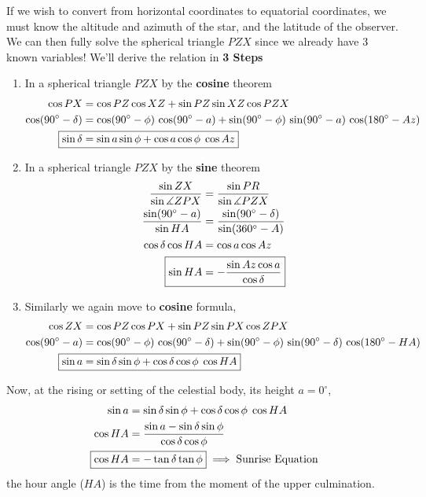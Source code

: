 \documentclass[a4paper,12pt]{extarticle}
\begin{document}
If we wish to convert from horizontal
coordinates to equatorial coordinates, we must know the altitude and azimuth of the star, and the latitude of the observer. We can then fully solve the spherical triangle $PZX$ since we already have 3 known variables! We'll derive the relation in \textbf{3 Steps}
\begin{enumerate}
	\item In a spherical triangle $PZX$ by the \textbf{cosine} theorem
	\begin{align*}
		\cos PX &= \cos PZ \cos XZ + \sin PZ \sin XZ \cos PZX\\
		\cos (90^\circ-\delta)&=\cos (90^\circ-\phi)\,\cos (90^\circ-a)+ \sin (90^\circ-\phi)\,\sin (90^\circ-a)\, \cos (180^\circ-Az)\\
		\Aboxed{\sin\delta &= \sin a \sin \phi + \cos a \cos \phi \; \cos Az}
	\end{align*}
	\item  In a spherical triangle $PZX$ by the \textbf{sine} theorem
	\begin{align*}
		\frac{\sin ZX}{\sin \measuredangle ZPX}&=\frac{\sin PR}{\sin \measuredangle PZX}\\
		\frac{\sin(90^\circ-a)}{\sin HA}&=\frac{\sin(90^\circ-\delta)}{\sin(360^\circ-A)}\\
		\cos \delta \cos HA &=\cos a \cos Az\\
		\Aboxed{\sin HA &= -\frac{\sin Az \cos a}{\cos\delta }}
	\end{align*}
	\item Similarly we again move to \textbf{cosine} formula, 
	\begin{align*}
		\cos ZX &= \cos PZ \cos PX + \sin PZ \sin PX \cos ZPX\\
		\cos (90^\circ-a)&=\cos (90^\circ-\phi)\,\cos (90^\circ-\delta)+ \sin (90^\circ-\phi)\,\sin (90^\circ-\delta)\, \cos (180^\circ-HA)\\
		\Aboxed{\sin a &= \sin \delta \sin \phi + \cos \delta \cos \phi \; \cos HA}
	\end{align*}	
\end{enumerate}
Now, at the rising or setting of the celestial body,
its height $a=0^\circ$,
\begin{align*}
	\sin a &= \sin \delta \sin \phi + \cos \delta \cos \phi \; \cos HA\\
	\cos HA&=\frac{\sin a -\sin \delta \sin \phi}{\cos \delta \cos \phi}\\
	\Aboxed{\cos HA&= - \tan \delta \tan \phi} \implies \text{Sunrise Equation}
\end{align*}
the hour angle ($HA$) is the time from the moment of the upper culmination.\\
\end{document}
